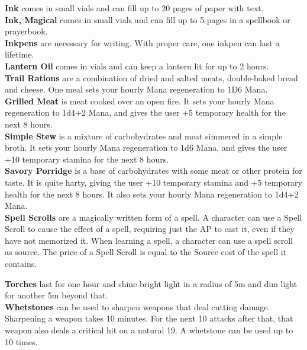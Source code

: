 \textbf{Ink} comes in small vials and can fill up to 20 pages of paper with text.\\

\textbf{Ink, Magical} comes in small vials and can fill up to 5 pages in a spellbook or prayerbook.\\

\textbf{Inkpens} are necessary for writing.
With proper care, one inkpen can last a lifetime.\\

\textbf{Lantern Oil} comes in vials and can keep a lantern lit for up to 2 hours.\\

\textbf{Trail Rations} are a combination of dried and salted meats, double-baked bread and cheese.
One meal sets your hourly Mana regeneration to 1D6 Mana.\\

\textbf{Grilled Meat} is meat cooked over an open fire.
It sets your hourly Mana regeneration to 1d4+2 Mana, and gives the user +5 temporary health for the next 8 hours.\\

\textbf{Simple Stew} is a mixture of carbohydrates and meat simmered in a simple broth.
It sets your hourly Mana regeneration to 1d6 Mana, and gives the user +10 temporary stamina for the next 8 hours.\\

\textbf{Savory Porridge} is a base of carbohydrates with some meat or other protein for taste.
It is quite harty, giving the user +10 temporary stamina and +5 temporary health for the next 8 hours.
It also sets your hourly Mana regeneration to 1d4+2 Mana.\\

\textbf{Spell Scrolls} are a magically written form of a spell.
A character can use a Spell Scroll to cause the effect of a spell, requiring just the AP to cast it, even if they have not memorized it.
When learning a spell, a character can use a spell scroll as source.
The price of a Spell Scroll is equal to the Source cost of the spell it contains.

\textbf{Torches} last for one hour and shine bright light in a radius of 5m and dim light for another 5m beyond that.\\

\textbf{Whetstones} can be used to sharpen weapons that deal cutting damage.
Sharpening a weapon takes 10 minutes.
For the next 10 attacks after that, that weapon also deals a critical hit on a natural 19.
A whetstone can be used up to 10 times.\\